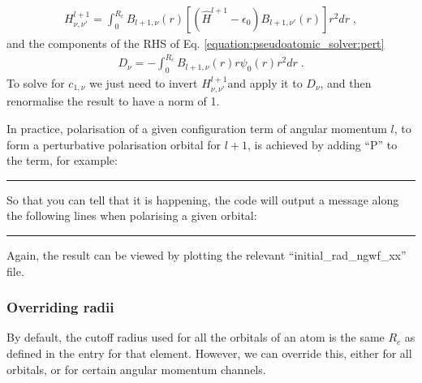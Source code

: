 \documentclass[letterpaper,10pt,english]{sphinxmanual}
\begin{document}
\label{\detokenize{pseudoatomic_solver:equation-pert}}\begin{equation}\label{equation:pseudoatomic_solver:pert}
\begin{split}H_{\nu,\nu'}^{l+1}=\int_{0}^{R_{c}}B_{l+1,\nu}(r)\left[(\hat{H}^{l+1}-\epsilon_{0})B_{l+1,\nu'}(r)\right]r^{2}dr\;,\end{split}
\end{equation}
and the components of the RHS of Eq. \eqref{equation:pseudoatomic_solver:pert}
\begin{equation*}
\begin{split}D_{\nu}=-\int_{0}^{R_{c}}B_{l+1,\nu}(r)r\psi_{0}(r)r^{2}dr\;.\end{split}
\end{equation*}
To solve for \(c_{1,\nu}\) we just need to invert
\(H_{\nu,\nu'}^{l+1}\)and apply it to \(D_{\nu}\), and then
renormalise the result to have a norm of 1.

In practice, polarisation of a given configuration term of angular
momentum \(l\), to form a perturbative polarisation orbital for
\(l+1\), is achieved by adding “\textbar{}P” to the term, for example:


\bigskip\hrule\bigskip








So that you can tell that it is happening, the code will output a
message along the following lines when polarising a given orbital:


\bigskip\hrule\bigskip



Again, the result can be viewed by plotting the relevant
“initial\_rad\_ngwf\_xx” file.


\subsubsection{Overriding radii}
\label{\detokenize{pseudoatomic_solver:overriding-radii}}
By default, the cutoff radius used for all the orbitals of an atom is
the same \(R_{c}\) as defined in the  entry for
that element. However, we can override this, either for all orbitals, or
for certain angular momentum channels.
\end{document}
